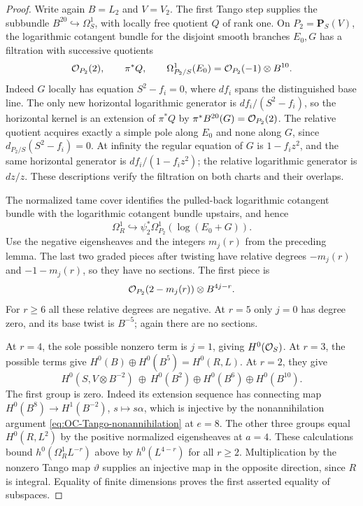 \begin{proof}
Write again $B=L_2$ and $V=V_2$.  The first Tango step supplies the subbundle $B^{20}\hookrightarrow\Omega_S^1$, with locally free quotient $Q$ of rank one.  On $P_2=\mathbf P_S(V)$, the logarithmic cotangent bundle for the disjoint smooth branches $E_0,G$ has a filtration with successive quotients
\begin{equation}\label{eq:OC-log-cotangent-filtration}
 \mathcal O_{P_2}(2),\qquad\pi^*Q,\qquad
 \Omega^1_{P_2/S}(E_0)=\mathcal O_{P_2}(-1)\otimes B^{10}.
\end{equation}
Indeed $G$ locally has equation $S^2-f_i=0$, where $df_i$ spans the distinguished base line.  The only new horizontal logarithmic generator is $df_i/(S^2-f_i)$, so the horizontal kernel is an extension of $\pi^*Q$ by
$\pi^*B^{20}(G)=\mathcal O_{P_2}(2)$.
The relative quotient acquires exactly a simple pole along $E_0$ and none along $G$, since $d_{P_2/S}(S^2-f_i)=0$.  At infinity the regular equation of $G$ is $1-f_i z^2$, and the same horizontal generator is $df_i/(1-f_i z^2)$; the relative logarithmic generator is $dz/z$.  These descriptions verify the filtration on both charts and their overlaps.

The normalized tame cover identifies the pulled-back logarithmic cotangent bundle with the logarithmic cotangent bundle upstairs, and hence
\[
             \Omega_R^1\hookrightarrow
             \psi_2^*\Omega_{P_2}^1(\log(E_0+G)).
\]
Use the negative eigensheaves and the integers $m_j(r)$ from the preceding lemma.  The last two graded pieces after twisting have relative degrees $-m_j(r)$ and $-1-m_j(r)$, so they have no sections.  The first piece is
\begin{equation}\label{eq:OC-first-log-piece}
                 \mathcal O_{P_2}(2-m_j(r))\otimes B^{4j-r}.
\end{equation}
For $r\geq6$ all these relative degrees are negative.  At $r=5$ only $j=0$ has degree zero, and its base twist is $B^{-5}$; again there are no sections.

At $r=4$, the sole possible nonzero term is $j=1$, giving $H^0(\mathcal O_S)$.  At $r=3$, the possible terms give $H^0(B)\oplus H^0(B^5)=H^0(R,L)$.  At $r=2$, they give
\[
 H^0(S,V\otimes B^{-2})\ \oplus\ H^0(B^2)
                      \oplus H^0(B^6)\oplus H^0(B^{10}).
\]
The first group is zero.  Indeed its extension sequence has connecting map
$H^0(B^8)\to H^1(B^{-2})$, $s\mapsto s\alpha$, which is injective by the nonannihilation argument \eqref{eq:OC-Tango-nonannihilation} at $e=8$.
The other three groups equal $H^0(R,L^2)$ by the positive normalized eigensheaves at $a=4$.
These calculations bound $h^0(\Omega_R^1 L^{-r})$ above by $h^0(L^{4-r})$ for all $r\geq2$.  Multiplication by the nonzero Tango map $\vartheta$ supplies an injective map in the opposite direction, since $R$ is integral.  Equality of finite dimensions proves the first asserted equality of subspaces.


\end{proof}
